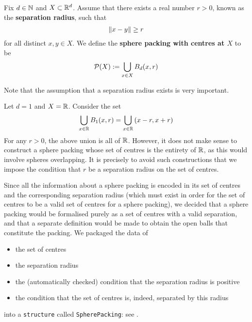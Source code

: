 \begin{boxdefinition}
    Fix $d \in \mathbb{N}$ and $X \subset \mathbb{R}^d$. Assume that there exists a real number $r > 0$, known as the \textbf{separation radius}, such that
    \begin{align*}
        \left\lVert x - y \right\rVert \geq r
    \end{align*}
    for all distinct $x, y \in X$. We define the \textbf{sphere packing with centres at $X$} to be
    \begin{align*}
        \mathcal{P}(X) := \bigcup_{x \in X} B_d(x, r)
    \end{align*}
\end{boxdefinition}

Note that the assumption that a separation radius exists is very important.

\begin{boxnexample}
    Let $d = 1$ and $X = \mathbb{R}$. Consider the set
    \begin{align*}
        \bigcup_{x \in \mathbb{R}} B_1(x, r) = \bigcup_{x \in \mathbb{R}} \left( x-r, x+r \right)
    \end{align*}
    For any $r > 0$, the above union is all of $\mathbb{R}$. However, it does not make sense to construct a sphere packing whose set of centres is the entirety of $\mathbb{R}$, as this would involve spheres overlapping. It is precisely to avoid such constructions that we impose the condition that $r$ be a separation radius on the set of centres.
\end{boxnexample}

Since all the information about a sphere packing is encoded in its set of centres and the corresponding separation radius (which must exist in order for the set of centres to be a valid set of centres for a sphere packing), we decided that a sphere packing would be formalised purely as a set of centres with a valid separation, and that a separate definition would be made to obtain the open balls that constitute the packing. We packaged the data of
\begin{itemize}
    \item the set of centres
    \item the separation radius
    \item the (automatically checked) condition that the separation radius is positive
    \item the condition that the set of centres is, indeed, separated by this radius
\end{itemize}
into a \verb|structure| called \verb|SpherePacking|: see \cite[\texttt{SpherePacking.Basic.SpherePacking}]{documentation}.

